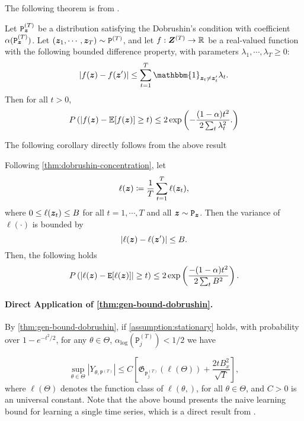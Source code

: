 The following theorem is from \cite{dagan2019learning, kulske2003concentration}.
\begin{theorem}\label{thm:dobrushin-concentration}
    Let $\mathtt{P}^{(T)}_{\bm{z}}$ be a distribution satisfying the Dobrushin's condition with coefficient $\alpha(\mathtt{P}_{\bm{z}}^{(T)})$.
    Let $(\bm{z}_1,\cdots,\bm{z}_T) \sim \mathtt{P}^{(T)}$, and let $f: \bm{Z}^{(T)} \rightarrow \mathbb{R}$ be a real-valued function with the following bounded difference property, with parameters $\lambda_1, \cdots, \lambda_T \geq 0$:
    \[
    \vert f(\bz) - f(\bz^\prime) \vert 
    \leq
    \sum_{t=1}^T
    \mathbbm{1}_{\bz_t\neq \bz_t^\prime}
    \lambda_t.
    \]
    Then for all $t > 0$,
    \[
    P
    \left(
        \vert 
        f(\bm{z})
        -
        \mathbb{E}
        [ f(\bm{z}) ]
        \geq
        t
    \right)
    \leq
    2 \exp
    \left(
    -
    \frac{(1 - \alpha)t^2}{2 \sum_t \lambda_t^2}.
    \right)
    \]
\end{theorem}
The following corollary directly follows from the above result
\begin{corollary}\label{cor:subgaussian-loss}
    Following \cref{thm:dobrushin-concentration}, let
    \[
    \ell( \bm{z})
    \coloneqq
    \frac{1}{T}
    \sum_{t=1}^T
    \ell( \bm{z}_t),
    \]
    where $0 \leq \ell(\bm{z}_t) \leq B$ for all $t=1,\cdots,T$ and all $\bm{z} \sim \mathtt{P}_{\bm{z}}$.
    Then the variance of $\ell(\cdot)$ is bounded by
    \[
    \vert 
        \ell(\bm{z})
        -
        \ell(\bm{z}^\prime)
    \vert
    \leq
    B.
    \]
    Then, the following holds
    \[
        P
        \left(
        \left\vert
        \ell(\bm{z})
        -
        \mathtt{E}
        [ \ell(\bm{z}) ]
        \right\vert
        \geq
        t
        \right)
        \leq
        2
        \exp
        \left(
        \frac{- (1 - \alpha) t^2 }{2 \sum_t B^2}
        \right)
        .
    \]
\end{corollary}

\paragraph{Direct Application of \cref{thm:gen-bound-dobrushin}.}
By \cref{thm:gen-bound-dobrushin}, if \cref{assumption:stationary} holds, with probability over $1 - e^{-t^2/2}$, for any $\theta \in \Theta$, $\alpha_{\log}(\mathtt{P}^{(T)}_j) < 1/2$ we have

\[
\sup_{\theta \in \Theta }
\left\vert
Y_{\theta, \mathtt{P}^{(T)}}
\right\vert
\leq
C 
\left[
\mathfrak{G}_{\mathtt{P}^{(T)}_j}(\ell(\Theta))
+
\frac{2tB_x^2}{\sqrt{T}}
\right],
\]
where $\ell(\Theta)$ denotes the function class of $\ell( \theta, )$, for all $\theta\in\Theta$, and $C > 0$ is an universal constant.
Note that the above bound presents the naive learning bound for learning a single time series, which is a direct result from \cite{dagan2019learning}.



